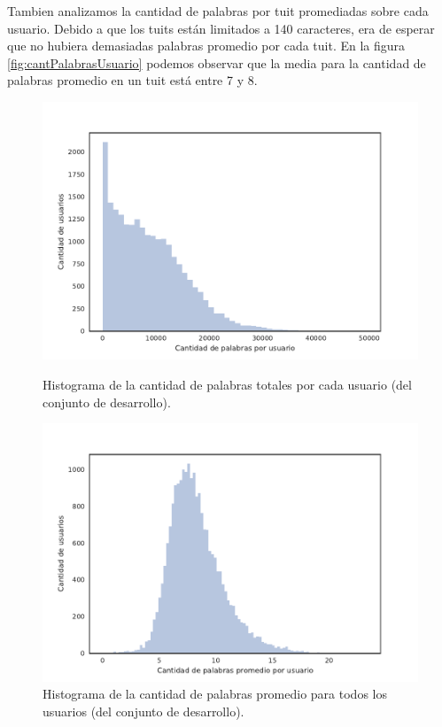 Tambien analizamos la cantidad de palabras por tuit promediadas sobre cada usuario.
Debido a que los tuits están limitados a 140 caracteres, era de esperar que no hubiera demasiadas palabras promedio por cada tuit. En la figura \ref{fig:cantPalabrasUsuario} podemos observar que la media para la cantidad de palabras promedio en un tuit está entre 7 y 8.
\begin{figure}[!ht]\centering
  \begin{minipage}{0.49\textwidth}
    \includegraphics[width=\linewidth]{./images/train/conFiltro/cantPalabrasUsuario.pdf}
    \caption{Histograma de la cantidad de palabras totales por cada usuario (del conjunto de desarrollo).} 
    \label{fig:cantPalabrasUsuario} 
   \end{minipage}
   \begin{minipage}{0.49\textwidth}
    \includegraphics[width=\linewidth]{./images/train/conFiltro/cantPalabrasPromedio.pdf}
    \caption{Histograma de la cantidad de palabras promedio para todos los usuarios (del conjunto de desarrollo).} 
    \label{fig:cantPalabrasPromedio} 
   \end{minipage}
   
\end{figure}

